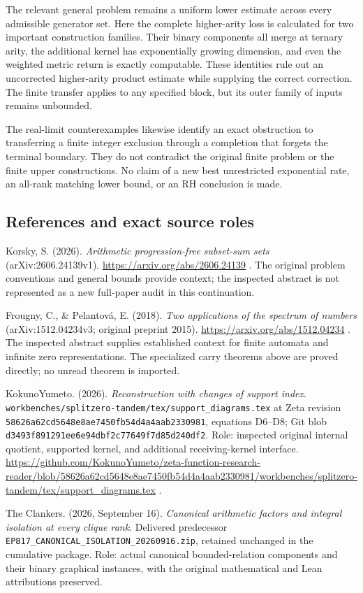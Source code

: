 The relevant general problem remains a uniform lower estimate across every admissible generator set. Here the complete higher-arity loss is calculated for two important construction families. Their binary components all merge at ternary arity, the additional kernel has exponentially growing dimension, and even the weighted metric return is exactly computable. These identities rule out an uncorrected higher-arity product estimate while supplying the correct correction. The finite transfer applies to any specified block, but its outer family of inputs remains unbounded.

The real-limit counterexamples likewise identify an exact obstruction to transferring a finite integer exclusion through a completion that forgets the terminal boundary. They do not contradict the original finite problem or the finite upper constructions. No claim of a new best unrestricted exponential rate, an all-rank matching lower bound, or an RH conclusion is made.

\subsection{References and exact source roles}\label{n20-references-and-exact-source-roles}

Korsky, S. (2026). \emph{Arithmetic progression-free subset-sum sets} (arXiv:2606.24139v1). \url{https://arxiv.org/abs/2606.24139} . The original problem conventions and general bounds provide context; the inspected abstract is not represented as a new full-paper audit in this continuation.

Frougny, C., \& Pelantová, E. (2018). \emph{Two applications of the spectrum of numbers} (arXiv:1512.04234v3; original preprint 2015). \url{https://arxiv.org/abs/1512.04234} . The inspected abstract supplies established context for finite automata and infinite zero representations. The specialized carry theorems above are proved directly; no unread theorem is imported.

KokunoYumeto. (2026). \emph{Reconstruction with changes of support index}. \nolinkurl{workbenches/splitzero-tandem/tex/support_diagrams.tex} at Zeta revision \nolinkurl{58626a62cd5648e8ae7450fb54d4a4aab2330981}, equations D6--D8; Git blob \nolinkurl{d3493f891291ee6e94dbf2c77649f7d85d240df2}. Role: inspected original internal quotient, supported kernel, and additional receiving-kernel interface. \url{https://github.com/KokunoYumeto/zeta-function-research-reader/blob/58626a62cd5648e8ae7450fb54d4a4aab2330981/workbenches/splitzero-tandem/tex/support_diagrams.tex} .

The Clankers. (2026, September 16). \emph{Canonical arithmetic factors and integral isolation at every clique rank}. Delivered predecessor \nolinkurl{EP817_CANONICAL_ISOLATION_20260916.zip}, retained unchanged in the cumulative package. Role: actual canonical bounded-relation components and their binary graphical instances, with the original mathematical and Lean attributions preserved.
